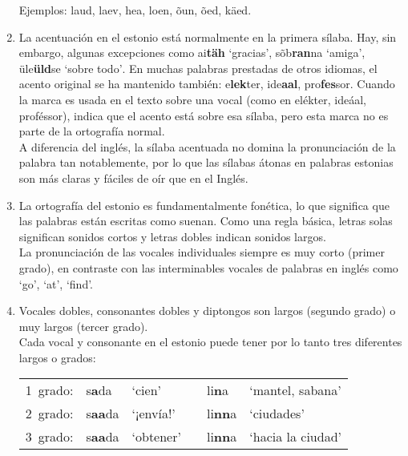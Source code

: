 \begin{enumerate}
 	Ejemplos: laud, laev, hea, loen, õun, õed, käed.\\

 	\item La acentuación en el estonio está normalmente en la primera sílaba. Hay, sin embargo, algunas excepciones como \foreignlanguage{estonian}{ai\textbf{täh} `gracias', sõb\textbf{ran}na `amiga', üle\textbf{üld}se `sobre todo'}. En muchas palabras prestadas de otros idiomas, el acento original se ha mantenido también: e\textbf{lek}ter, ide\textbf{aal}, pro\textbf{fes}sor. Cuando la marca \textasciiacute es usada en el texto sobre una vocal (como en elékter, ideáal, proféssor), indica que el acento está sobre esa sílaba, pero esta marca no es parte de la ortografía normal.\\

 	A diferencia del inglés, la sílaba acentuada no domina la pronunciación de la palabra tan notablemente, por lo que las sílabas átonas en palabras estonias son más claras y fáciles de oír que en el Inglés.\\

 	\item La ortografía del estonio es fundamentalmente fonética, lo que significa que las palabras están escritas como suenan. Como una regla básica, letras solas significan sonidos cortos y letras dobles indican sonidos largos.\\

 	La pronunciación de las vocales individuales siempre es muy corto (primer grado), en contraste con las interminables vocales de palabras en inglés como `go', `at', `find'.\\

 	\item Vocales dobles, consonantes dobles y diptongos son largos (segundo grado) o muy largos (tercer grado).\\

 	Cada vocal y consonante en el estonio puede tener por lo tanto tres diferentes largos o grados:\\

 	\begin{tabular}{ r l l c l l}
 		1\textordmasculine\ grado: & s\textbf{a}da 					& `cien' 		& & li\textbf{n}a 					& `mantel, sabana' \\
 		2\textordmasculine\ grado: & s\textbf{aa}da 				& `¡envía!' 	& & li\textbf{nn}a 					& `ciudades' \\
 		3\textordmasculine\ grado: & \textasciigrave s\textbf{aa}da & `obtener' 	& & \textasciigrave li\textbf{nn}a 	& `hacia la ciudad' 
 	\end{tabular}


\end{enumerate}
